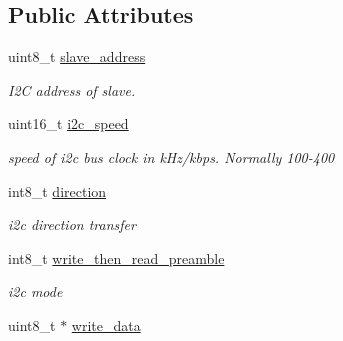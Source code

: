 \subsection*{Public Attributes}
\begin{DoxyCompactItemize}
\item 
\hypertarget{structi2c__packet__conf__t_a2e6987f08dfd4d4bcb27c704e59c5c77}{uint8\+\_\+t \hyperlink{structi2c__packet__conf__t_a2e6987f08dfd4d4bcb27c704e59c5c77}{slave\+\_\+address}}\label{structi2c__packet__conf__t_a2e6987f08dfd4d4bcb27c704e59c5c77}

\begin{DoxyCompactList}\small\item\em I2\+C address of slave. \end{DoxyCompactList}\item 
\hypertarget{structi2c__packet__conf__t_a6473a566809d74723790bf3c2214d77c}{uint16\+\_\+t \hyperlink{structi2c__packet__conf__t_a6473a566809d74723790bf3c2214d77c}{i2c\+\_\+speed}}\label{structi2c__packet__conf__t_a6473a566809d74723790bf3c2214d77c}

\begin{DoxyCompactList}\small\item\em speed of i2c bus clock in k\+Hz/kbps. Normally 100-\/400 \end{DoxyCompactList}\item 
\hypertarget{structi2c__packet__conf__t_a3d68dac643935965d675b5b7285006c5}{int8\+\_\+t \hyperlink{structi2c__packet__conf__t_a3d68dac643935965d675b5b7285006c5}{direction}}\label{structi2c__packet__conf__t_a3d68dac643935965d675b5b7285006c5}

\begin{DoxyCompactList}\small\item\em i2c direction transfer \end{DoxyCompactList}\item 
\hypertarget{structi2c__packet__conf__t_ac89074bb47d8d2242099405253ad3760}{int8\+\_\+t \hyperlink{structi2c__packet__conf__t_ac89074bb47d8d2242099405253ad3760}{write\+\_\+then\+\_\+read\+\_\+preamble}}\label{structi2c__packet__conf__t_ac89074bb47d8d2242099405253ad3760}

\begin{DoxyCompactList}\small\item\em i2c mode \end{DoxyCompactList}\item 
\hypertarget{structi2c__packet__conf__t_a9dfa0b1a0bddf1e0e693bfdb52e14332}{uint8\+\_\+t $\ast$ \hyperlink{structi2c__packet__conf__t_a9dfa0b1a0bddf1e0e693bfdb52e14332}{write\+\_\+data}}\label{structi2c__packet__conf__t_a9dfa0b1a0bddf1e0e693bfdb52e14332}


\end{DoxyCompactItemize}

